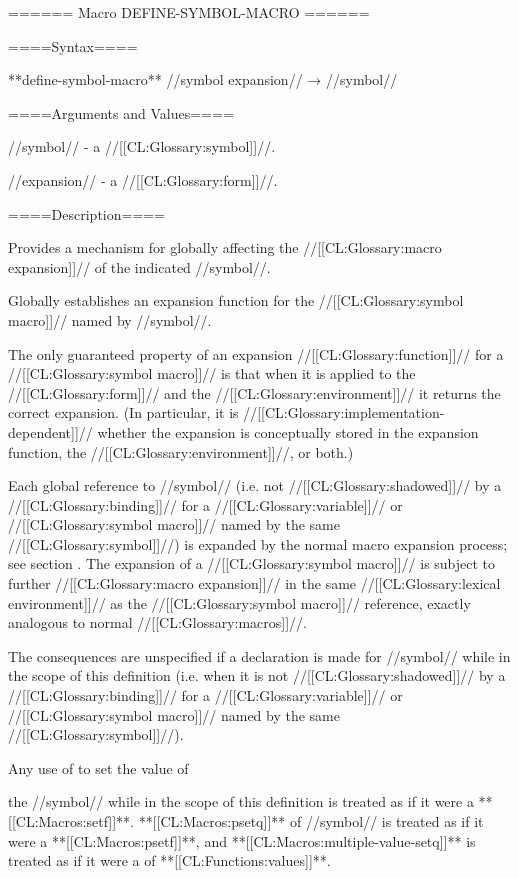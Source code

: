 ====== Macro DEFINE-SYMBOL-MACRO ======

====Syntax====

**define-symbol-macro** //symbol expansion// → //symbol//

====Arguments and Values====

//symbol// - a //[[CL:Glossary:symbol]]//.

//expansion// - a //[[CL:Glossary:form]]//.

====Description====

Provides a mechanism for globally affecting the //[[CL:Glossary:macro expansion]]// of the indicated //symbol//.

Globally establishes an expansion function for the //[[CL:Glossary:symbol macro]]// named by //symbol//.

The only guaranteed property of an expansion //[[CL:Glossary:function]]// for a //[[CL:Glossary:symbol macro]]// is that when it is applied to the //[[CL:Glossary:form]]// and the //[[CL:Glossary:environment]]// it returns the correct expansion. (In particular, it is //[[CL:Glossary:implementation-dependent]]// whether the expansion is conceptually stored in the expansion function, the //[[CL:Glossary:environment]]//, or both.)

Each global reference to //symbol// (i.e. not //[[CL:Glossary:shadowed]]// by a //[[CL:Glossary:binding]]// for a //[[CL:Glossary:variable]]// or //[[CL:Glossary:symbol macro]]// named by the same //[[CL:Glossary:symbol]]//) is expanded by the normal macro expansion process; see section {\secref\SymbolsAsForms}. The expansion of a //[[CL:Glossary:symbol macro]]// is subject to further //[[CL:Glossary:macro expansion]]// in the same //[[CL:Glossary:lexical environment]]// as the //[[CL:Glossary:symbol macro]]// reference, exactly analogous to normal //[[CL:Glossary:macros]]//.


The consequences are unspecified if a  declaration is made for //symbol// while in the scope of this definition (i.e. when it is not //[[CL:Glossary:shadowed]]// by a //[[CL:Glossary:binding]]// for a //[[CL:Glossary:variable]]// or //[[CL:Glossary:symbol macro]]// named by the same //[[CL:Glossary:symbol]]//).

Any use of  to set the value of

the //symbol// while in the scope of this definition is treated as if it were a **[[CL:Macros:setf]]**. **[[CL:Macros:psetq]]** of //symbol// is treated as if it were a **[[CL:Macros:psetf]]**, and **[[CL:Macros:multiple-value-setq]]** is treated as if it were a  of **[[CL:Functions:values]]**.

